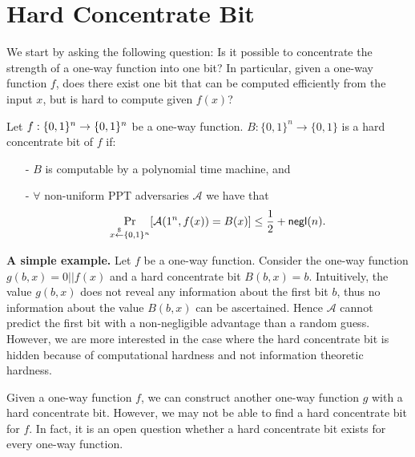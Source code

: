 %
%
%
%
%
%
%
\fi


\section{Hard Concentrate Bit}
We start by asking the following question: Is it possible to concentrate the strength of a one-way function into one bit? In particular, given a one-way function $f$, does there exist one bit that can be computed efficiently from the input $x$, but is hard to compute given $f(x)$?
\begin{definition}
Let $f:\{0,1\}^{n} \rightarrow \{0,1\}^{n}$ be a one-way function.
$B:\{0,1\}^n \rightarrow \{0,1\}$ is a hard concentrate bit of $f$ if:
\begin{itemize}
\item[-] $B$ is computable by a polynomial time machine, and
\item[-] $\forall$ non-uniform PPT adversaries $\mathcal{A}$ we have that
	$$\Pr_{x\stackrel{\$}{\leftarrow} \{0,1\}^{n}}[\mathcal{A}(1^n, f(x)) = B(x)] \leq \frac{1}{2} + \mathsf{negl}(n).$$
\end{itemize}
\end{definition}

\noindent\textbf{A simple example.}
Let $f$ be a one-way function. Consider the one-way function $g(b, x) = 0 || f(x)$ and a hard concentrate bit $B(b, x) = b$.
Intuitively, the value $g(b, x)$ does not reveal any information about the first bit $b$, thus no information about the value $B(b, x)$ can be ascertained. Hence $\mathcal{A}$ cannot predict the first bit with a non-negligible advantage than a random guess. However, we are more interested in the case where the hard concentrate bit is hidden because of computational hardness and not information theoretic hardness.
\begin{remark}
Given a one-way function $f$, we can construct another one-way function $g$ with a hard concentrate bit. However, we may not be able to find a hard concentrate bit for $f$. In fact, it is an open question whether a hard concentrate bit exists for every one-way function.
\end{remark}


